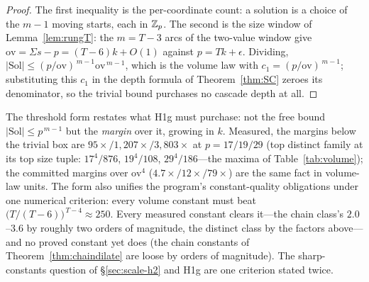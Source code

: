 \begin{proof}
The first inequality is the per-coordinate count: a solution is a
choice of the $m-1$ moving starts, each in $\mathbb{Z}_p$. The second is the
size window of Lemma~\ref{lem:rungT}: the $m=T-3$ arcs of the
two-value window give $\mathrm{ov}=\Sigma s-p=(T-6)k+O(1)$ against
$p=Tk+\epsilon$. Dividing,
$|\mathrm{Sol}|\le(p/\mathrm{ov})^{\,m-1}\mathrm{ov}^{\,m-1}$, which is
the volume law with $c_1=(p/\mathrm{ov})^{\,m-1}$; substituting this
$c_1$ in the depth formula of Theorem~\ref{thm:SC} zeroes its
denominator, so the trivial bound purchases no cascade depth at all.
\end{proof}

The threshold form restates what H1g must purchase: not the free
bound $|\mathrm{Sol}|\le p^{\,m-1}$ but the \emph{margin} over it,
growing in $k$. Measured, the margins below the trivial box are
$95\times/1{,}207\times/3{,}803\times$ at $p=17/19/29$ (top distinct
family at its top size tuple: $17^{4}/876$, $19^{4}/108$,
$29^{4}/186$---the maxima of Table~\ref{tab:volume}); the committed
margins over $\mathrm{ov}^{4}$ ($4.7\times/12\times/79\times$) are
the same fact in volume-law units. The form also unifies the program's
constant-quality obligations under one numerical criterion: every
volume constant must beat $\bigl(T/(T-6)\bigr)^{\,T-4}\approx250$.
Every measured constant clears it---the chain class's
$2.0$--$3.6$ by roughly two orders of magnitude, the distinct class by
the factors above---and no proved constant yet does (the chain
constants of Theorem~\ref{thm:chaindilate} are loose by orders of
magnitude). The sharp-constants question of \S\ref{sec:scale-h2} and
H1g are one criterion stated twice.

